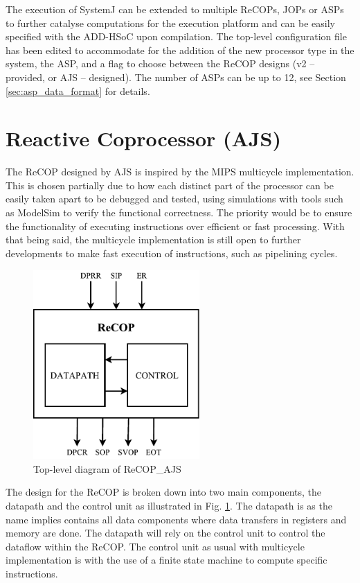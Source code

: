 \documentclass[]{article}
\begin{document}
	The execution of SystemJ can be extended to multiple ReCOPs, JOPs or ASPs to further catalyse computations for the execution platform and can be easily specified with the ADD-HSoC upon compilation. The top-level configuration file has been edited to accommodate for the addition of the new processor type in the system, the ASP, and a flag to choose between the ReCOP designs (v2 -- provided, or AJS -- designed). The number of ASPs can be up to 12, see Section \ref{sec:asp_data_format} for details.
	
	
	\section{Reactive Coprocessor (AJS)}
	The ReCOP designed by AJS is inspired by the MIPS multicycle implementation. This is chosen partially due to how each distinct part of the processor can be easily taken apart to be debugged and tested, using simulations with tools such as ModelSim to verify the functional correctness. The priority would be to ensure the functionality of executing instructions over efficient or fast processing. With that being said, the multicycle implementation is still open to further developments to make fast execution of instructions, such as pipelining cycles. \par 
	
	\begin{figure}[H]
		\centering
		\includegraphics[width = 2.5in]{recop_block_diagram}
		\caption{Top-level diagram of ReCOP\_AJS}
		\label{fig:recop_block}
	\end{figure}
	
	The design for the ReCOP is broken down into two main components, the datapath and the control unit as illustrated in Fig. \ref{fig:recop_block}. The datapath is as the name implies contains all data components where data transfers in registers and memory are done. The datapath will rely on the control unit to control the dataflow within the ReCOP. The control unit as usual with multicycle implementation is with the use of a finite state machine to compute specific instructions.
	
\end{document}

